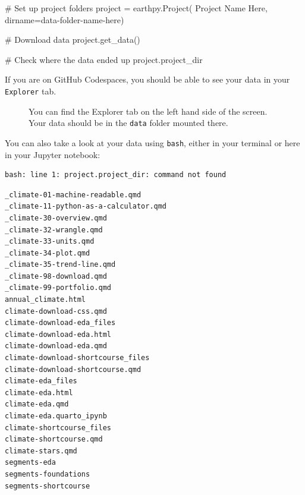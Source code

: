 \documentclass[
  letterpaper,
  DIV=11,
  numbers=noendperiod,
  oneside]{scrreprt}
\makeatletter
\newenvironment{Shaded}{\begin{snugshade}}{\end{snugshade}}
\newcommand{\CommentTok}[1]{\textcolor[rgb]{0.37,0.37,0.37}{#1}}
\newcommand{\NormalTok}[1]{\textcolor[rgb]{0.00,0.23,0.31}{#1}}
\newcommand{\OperatorTok}[1]{\textcolor[rgb]{0.37,0.37,0.37}{#1}}
\newcommand{\StringTok}[1]{\textcolor[rgb]{0.13,0.47,0.30}{#1}}
\newcommand*\pandocbounded[1]{%
  \sbox\pandoc@box{#1}%
  \Gscale@div\@tempa{\textheight}{\dimexpr\ht\pandoc@box+\dp\pandoc@box\relax}%
  \Gscale@div\@tempb{\linewidth}{\wd\pandoc@box}%
  \ifdim\@tempb\p@<\@tempa\p@\let\@tempa\@tempb\fi%
  \ifdim\@tempa\p@<\p@\scalebox{\@tempa}{\usebox\pandoc@box}%
  \else\usebox{\pandoc@box}%
  \fi%
}
\makeatother
\begin{document}
\begin{Shaded}
\begin{Highlighting}[]
\CommentTok{\# Set up project folders}
\NormalTok{project }\OperatorTok{=}\NormalTok{ earthpy.Project(}
    \StringTok{\textquotesingle{}Project Name Here\textquotesingle{}}\NormalTok{,}
\NormalTok{    dirname}\OperatorTok{=}\StringTok{\textquotesingle{}data{-}folder{-}name{-}here\textquotesingle{}}\NormalTok{)}

\CommentTok{\# Download data}
\NormalTok{project.get\_data()}

\CommentTok{\# Check where the data ended up}
\NormalTok{project.project\_dir}
\end{Highlighting}
\end{Shaded}

If you are on GitHub Codespaces, you should be able to see your data in
your \texttt{Explorer} tab.

\begin{figure}[H]

{\centering \pandocbounded{\texttt{[image: notebooks/01-climate/.pdf]}}

}

\caption{You can find the Explorer tab on the left hand side of the
screen. Your data should be in the \texttt{data} folder mounted there.}

\end{figure}%

You can also take a look at your data using \texttt{bash}, either in
your terminal or here in your Jupyter notebook:

\begin{Shaded}
\end{Shaded}

\begin{verbatim}
bash: line 1: project.project_dir: command not found
\end{verbatim}

\begin{verbatim}
_climate-01-machine-readable.qmd
_climate-11-python-as-a-calculator.qmd
_climate-30-overview.qmd
_climate-32-wrangle.qmd
_climate-33-units.qmd
_climate-34-plot.qmd
_climate-35-trend-line.qmd
_climate-98-download.qmd
_climate-99-portfolio.qmd
annual_climate.html
climate-download-css.qmd
climate-download-eda_files
climate-download-eda.html
climate-download-eda.qmd
climate-download-shortcourse_files
climate-download-shortcourse.qmd
climate-eda_files
climate-eda.html
climate-eda.qmd
climate-eda.quarto_ipynb
climate-shortcourse_files
climate-shortcourse.qmd
climate-stars.qmd
segments-eda
segments-foundations
segments-shortcourse
\end{verbatim}
\end{document}
